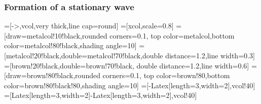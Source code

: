 \subsubsection*{Formation of a stationary wave }



\tikzset{>=latex} %
=[->,vcol,very thick,line cap=round]
=[xcol,scale=0.8]
=[draw=metalcol!10!black,rounded corners=0.1,
  top color=metalcol,bottom color=metalcol!80!black,shading angle=10]
=[metalcol!20!black,double=metalcol!70!black,double distance=1.2,line width=0.3]
=[brown!20!black,double=brown!70!black,
  double distance=1.2,line width=0.6] %
=[draw=brown!80!black,rounded corners=0.1,
  top color=brown!80,bottom color=brown!80!black!80,shading angle=10]
\def\tick#1#2{\draw[thick] (#1) ++ (#2:0.1) --++ (#2-180:0.2)}
=[-{Latex[length=3,width=2]},vcol!40]
=[{Latex[length=3,width=2]}-{Latex[length=3,width=2]},vcol!40]
\def\tick#1#2{\draw[thick] (#1) ++ (#2:0.1) --++ (#2-180:0.2)}



